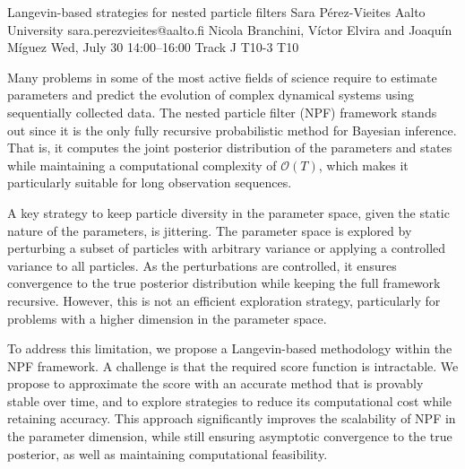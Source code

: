 \begin{talk}
  {Langevin-based strategies for nested particle filters}%
  {Sara Pérez-Vieites}%
  {Aalto University}%
  {sara.perezvieites@aalto.fi}%
  {Nicola Branchini, Víctor Elvira and Joaquín Míguez}%
  {}%
  {Wed, July 30 14:00–16:00 Track J}%
  {T10-3}%
  {T10}%
			
Many problems in some of the most active fields of science require to estimate parameters and predict the evolution of complex dynamical systems using sequentially collected data. The nested particle filter (NPF) framework stands out since it is the only fully recursive probabilistic method for Bayesian inference. That is, it computes the joint posterior distribution of the parameters and states while maintaining a computational complexity of $\mathcal{O}(T)$, which makes it particularly suitable for long observation sequences. 

A key strategy to keep particle diversity in the parameter space, given the static nature of the parameters, is jittering. The parameter space is explored by perturbing a subset of particles with arbitrary variance or applying a controlled variance to all particles. As the perturbations are controlled, it ensures convergence to the true posterior distribution while keeping the full framework recursive. However, this is not an efficient exploration strategy, particularly for problems with a higher dimension in the parameter space.

To address this limitation, we propose a Langevin-based methodology within the NPF framework. A challenge is that the required score function is intractable. We propose to approximate the score with an accurate method that is provably stable over time, and to explore strategies to reduce its computational cost while retaining accuracy.
This approach significantly improves the scalability of NPF in the parameter dimension, while still ensuring asymptotic convergence to the true posterior, as well as maintaining computational feasibility.

\medskip




\end{talk}
